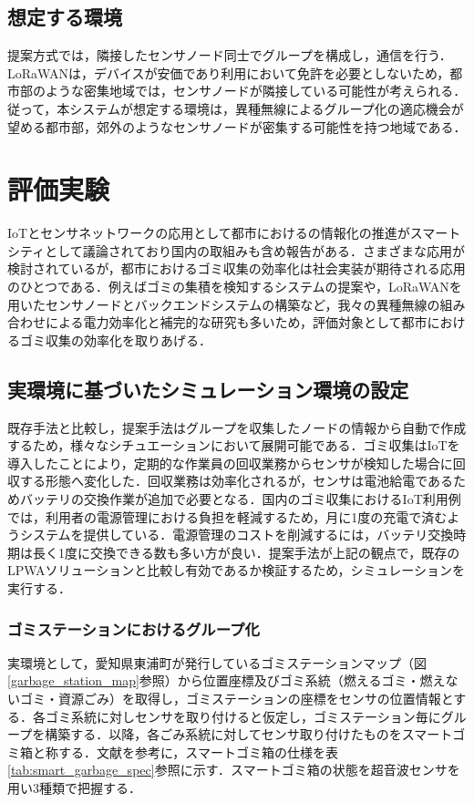 \documentclass[Japanese]{dicomopapers}
\begin{document}
\subsection{想定する環境}
提案方式では，隣接したセンサノード同士でグループを構成し，通信を行う．LoRaWANは，デバイスが安価であり利用において免許を必要としないため，都市部のような密集地域では，センサノードが隣接している可能性が考えられる．従って，本システムが想定する環境は，異種無線によるグループ化の適応機会が望める都市部，郊外のようなセンサノードが密集する可能性を持つ地域である．

\section{評価実験}
IoTとセンサネットワークの応用として都市におけるの情報化の推進がスマートシティとして議論されており国内の取組みも含め報告がある\cite{smart_cities}．さまざまな応用が検討されているが，都市におけるゴミ収集の効率化は社会実装が期待される応用のひとつである．例えばゴミの集積を検知するシステムの提案\cite{smart_trash_bin}や，LoRaWANを用いたセンサノードとバックエンドシステムの構築\cite{smart_waste_management}など，我々の異種無線の組み合わせによる電力効率化と補完的な研究も多いため，評価対象として都市におけるゴミ収集の効率化を取りあげる．

\subsection{実環境に基づいたシミュレーション環境の設定}
既存手法と比較し，提案手法はグループを収集したノードの情報から自動で作成するため，様々なシチュエーションにおいて展開可能である．ゴミ収集はIoTを導入したことにより，定期的な作業員の回収業務からセンサが検知した場合に回収する形態へ変化した．回収業務は効率化されるが，センサは電池給電であるためバッテリの交換作業が追加で必要となる．国内のゴミ収集におけるIoT利用例では，利用者の電源管理における負担を軽減するため，月に1度の充電で済むようシステムを提供している．電源管理のコストを削減するには，バッテリ交換時期は長く1度に交換できる数も多い方が良い．提案手法が上記の観点で，既存のLPWAソリューションと比較し有効であるか検証するため，シミュレーションを実行する．

\subsubsection{ゴミステーションにおけるグループ化}
実環境として，愛知県東浦町が発行しているゴミステーションマップ（図\ref{garbage_station_map}参照）から位置座標及びゴミ系統（燃えるゴミ・燃えないゴミ・資源ごみ）を取得し，ゴミステーションの座標をセンサの位置情報とする．各ゴミ系統に対しセンサを取り付けると仮定し，ゴミステーション毎にグループを構築する．以降，各ごみ系統に対してセンサ取り付けたものをスマートゴミ箱と称する．文献\cite{smart_garbage}を参考に，スマートゴミ箱の仕様を表\ref{tab:smart_garbage_spec}参照に示す．スマートゴミ箱の状態を超音波センサを用い3種類で把握する．
\end{document}
